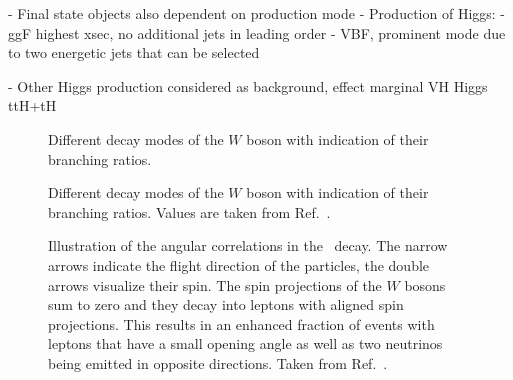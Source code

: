 - Final state objects also dependent on production mode
- Production of Higgs:
- ggF highest xsec, no additional jets in leading order
- VBF, prominent mode due to two energetic jets that can be selected


- Other Higgs production considered as background, effect marginal
VH Higgs
ttH+tH


\begin{figure}
    \caption{Different decay modes of the $W$ boson with indication of their branching ratios. Values are taken from Ref.~\cite{PDG2020}.}{Different decay modes of the $W$ boson with indication of their branching ratios.}
    \label{fig:w-branching-ratios}
\end{figure}


\begin{figure}
    \caption[Angular correlations in the \HWWdet\ decay.]{Illustration of the angular correlations in the \HWWdet\ decay. The narrow arrows indicate the flight direction of the particles, the double arrows visualize their spin. The spin projections of the $W$ bosons sum to zero and they decay into leptons with aligned spin projections. This results in an enhanced fraction of events with leptons that have a small opening angle as well as two neutrinos being emitted in opposite directions. Taken from Ref.~\cite{PhysRevD.92.012006}.}
    \label{fig:spin-correlations}
\end{figure}
